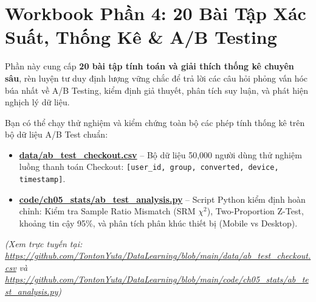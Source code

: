 \chapter{Workbook Phần 4: 20 Bài Tập Xác Suất, Thống Kê \& A/B Testing}

\begin{lythuyetbox}
Phần này cung cấp \textbf{20 bài tập tính toán và giải thích thống kê chuyên sâu}, rèn luyện tư duy định lượng vững chắc để trả lời các câu hỏi phỏng vấn hóc búa nhất về A/B Testing, kiểm định giả thuyết, phân tích suy luận, và phát hiện nghịch lý dữ liệu.
\end{lythuyetbox}

\begin{thuchanhbox}
Bạn có thể chạy thử nghiệm và kiểm chứng toàn bộ các phép tính thống kê trên bộ dữ liệu A/B Test chuẩn:
\begin{itemize}
    \item \href{run:./data/ab_test_checkout.csv}{\Large\textbf{\color{navyprimary}data/ab\_test\_checkout.csv}} -- Bộ dữ liệu 50,000 người dùng thử nghiệm luồng thanh toán Checkout: \texttt{[user\_id, group, converted, device, timestamp]}.
    \item \href{run:./code/ch05_stats/ab_test_analysis.py}{\Large\textbf{\color{navyprimary}code/ch05\_stats/ab\_test\_analysis.py}} -- Script Python kiểm định hoàn chỉnh: Kiểm tra Sample Ratio Mismatch (SRM $\chi^2$), Two-Proportion Z-Test, khoảng tin cậy 95\%, và phân tích phân khúc thiết bị (Mobile vs Desktop).
\end{itemize}
\small\textit{(Xem trực tuyến tại: \url{https://github.com/TontonYuta/DataLearning/blob/main/data/ab_test_checkout.csv} và \url{https://github.com/TontonYuta/DataLearning/blob/main/code/ch05_stats/ab_test_analysis.py})}
\end{thuchanhbox}

